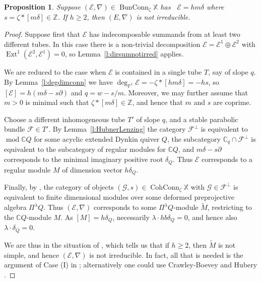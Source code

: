 \documentclass[12pt,a4paper]{amsart}
\theoremstyle{plain}
\newtheorem{prop}[thm]{Proposition}
\newcommand{\C}{\mathbb C}
\newcommand{\Z}{\mathbb Z}
\newcommand{\PP}{\mathbb P}
\DeclareMathOperator{\mmod}{mod}
\DeclareMathOperator{\Ext}{Ext}
\DeclareMathOperator{\BunConn}{BunConn}
\DeclareMathOperator{\CohConn}{CohConn}
\DeclareMathOperator{\dimv}{\underline\dim}
\newcommand{\F}{\mathcal F}
\newcommand{\E}{\mathcal E}
\newcommand{\G}{\mathcal G}
\newcommand{\XX}{\mathbb X}
\begin{document}
\begin{prop} 
\label{p:notubularirred}
Suppose $(\E,\nabla)\in\BunConn_\zeta\XX$ has $\dimv\E=hm\delta$ where $s=\zeta\ast[m\delta]\in\Z$. If $h\geq2$, then $(E,\nabla)$ is not irreducible.
\end{prop}

\begin{proof}
Suppose first that $\E$ has indecomposable summands from at least two different tubes. In this case there is a non-trivial decomposition $\E = \E^1\oplus\E^2$ with $\Ext^1(\E^2,\E^1)=0$, so Lemma~\ref{l:dirsumnotirred} applies.

We are reduced to the case when $\E$ is contained in a single tube $T$, say of slope $q$. By Lemma~\ref{l:degdimconn} we have $\deg_{\PP^1}\E=-\zeta\ast[hm\delta]=-hs$, so $[\E]=h(m\delta-s\partial)$ and $q=w-s/m$. Moreover, we may further assume that $m>0$ is minimal such that $\zeta\ast[m\delta]\in\Z$, and hence that $m$ and $s$ are coprime.

Choose a different inhomogeneous tube $T'$ of slope $q$, and a stable parabolic bundle $\F\in T'$. By Lemma~\ref{l:HubnerLenzing} the category $\F^\perp$ is equivalent to $\mmod\C Q$ for some acyclic extended Dynkin quiver $Q$, the subcategory $\C_q\cap\F^\perp$ is equivalent to the subcategory of regular modules for $\C Q$, and $m\delta-s\partial$ corresponds to the minimal imaginary positive root $\delta_Q$. Thus $\E$ corresponds to a regular module $M$ of dimension vector $h\delta_Q$.

Finally, by \cite{CBcw}, the category of objects $(\G,s)\in\CohConn_\zeta\XX$ with $\G\in\F^\perp$ is equivalent to finite dimensional modules over some deformed preprojective algebra $\Pi^\lambda Q$. Thus $(\E,\nabla)$ corresponds to some $\Pi^\lambda Q$-module $\widetilde M$, restricting to the $\C Q$-module $M$. As $[M]=h\delta_Q$, necessarily $\lambda\cdot hb\delta_Q=0$, and hence also $\lambda\cdot\delta_Q=0$.

We are thus in the situation of \cite[Theorem 1.2]{CBmm}, which tells us that if $h\geq2$, then $\widetilde M$ is not simple, and hence $(\E,\nabla)$ is not irreducible. In fact, all that is needed is the argument of Case (I) in \cite[\S10]{CBmm}; alternatively one could use Crawley-Boevey and Hubery \cite{CBHu}.
\end{proof}
\end{document}
